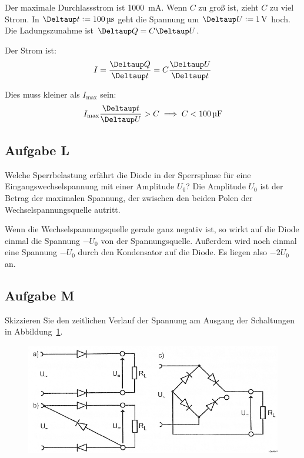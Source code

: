 Der maximale Durchlassstrom ist \SI{1000}{\milli\ampere}. Wenn $C$ zu groß ist,
zieht $C$ zu viel Strom. In $\Deltaup t := \SI{100}{\micro\second}$ geht die
Spannung um $\Deltaup U := \SI1\volt$ hoch. Die Ladungszunahme ist $\Deltaup Q
= C \Deltaup U$.

Der Strom ist:
\[
	I = \frac{\Deltaup Q}{\Deltaup t}
	= C \frac{\Deltaup U}{\Deltaup t}
\]

Dies muss kleiner als $I_\text{max}$ sein:
\[
	I_\text{max} \frac{\Deltaup t}{\Deltaup U} > C
	\implies
	C < \SI{100}{\micro\farad}
\]

\subsection{Aufgabe L}

\begin{problem}
	Welche Sperrbelastung erfährt die Diode in der Sperrsphase für eine
	Eingangswechselspannung mit einer Amplitude $U_0$? Die Amplitude $U_0$ ist
	der Betrag der maximalen Spannung, der zwischen den beiden Polen der
	Wechselspannungsquelle autritt.
\end{problem}

Wenn die Wechselspannungsquelle gerade ganz negativ ist, so wirkt auf die Diode
einmal die Spannung $- U_0$ von der Spannungsquelle. Außerdem wird noch einmal
eine Spannung $-U_0$ durch den Kondensator auf die Diode. Es liegen also
$-2U_0$ an.

\subsection{Aufgabe M}

\begin{problem}
	Skizzieren Sie den zeitlichen Verlauf der Spannung am Ausgang der
	Schaltungen in Abbildung~\ref{fig:2-9}.
\end{problem}

\begin{figure}[h]
	\centering
	\caption{%
		\cite[Abbildung~2.9]{physik313-Anleitung}
	}
	\label{fig:2-9}
	\includegraphics[width=\linewidth]{Bilder_aus_Anleitung/2-9.png}
\end{figure}

